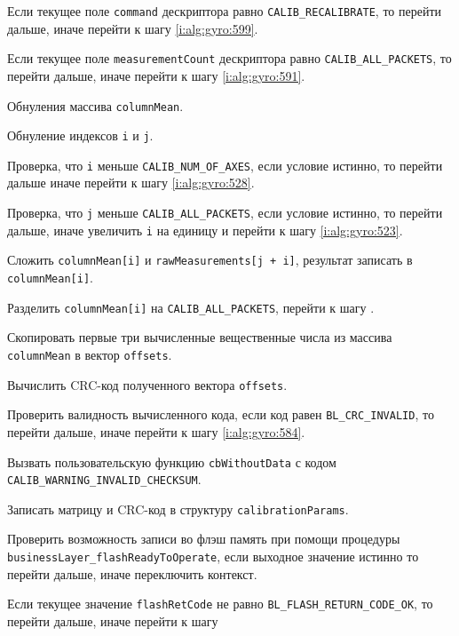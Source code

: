\begin{enumerate_step}
    \item \label{i:alg:gyro:571} Если текущее поле \lstinline|command| дескриптора равно \lstinline|CALIB_RECALIBRATE|, то перейти дальше, иначе перейти к шагу
    \ref{i:alg:gyro:599}.
    \item \label{i:alg:gyro:573} Если текущее поле \lstinline|measurementCount| дескриптора равно \lstinline|CALIB_ALL_PACKETS|, то перейти дальше, иначе перейти к шагу
    \ref{i:alg:gyro:591}.
    \item Обнуления массива \lstinline|columnMean|.
    \item Обнуление индексов \lstinline|i| и \lstinline|j|.
    \item \label{i:alg:gyro:517} Проверка, что \lstinline|i| меньше \lstinline|CALIB_NUM_OF_AXES|, если условие истинно, то перейти дальше иначе перейти к шагу \ref{i:alg:gyro:528}.
    \item Проверка, что \lstinline|j| меньше \lstinline|CALIB_ALL_PACKETS|, если условие истинно, то перейти дальше, иначе увеличить \lstinline|i| на единицу и перейти к шагу \ref{i:alg:gyro:523}.
    \item Сложить \lstinline|columnMean[i]| и \lstinline|rawMeasurements[j + i]|, результат записать в \lstinline|columnMean[i]|.
    \item \label{i:alg:gyro:523} Разделить \lstinline|columnMean[i]| на \lstinline|CALIB_ALL_PACKETS|, перейти к шагу \label{i:alg:gyro:517}.
    \item \label{i:alg:gyro:528} Скопировать первые три вычисленные вещественные числа из массива \lstinline|columnMean| в вектор \lstinline|offsets|.
    \item Вычислить CRC-код полученного вектора \lstinline|offsets|.
    \item Проверить валидность вычисленного кода, если код равен \lstinline|BL_CRC_INVALID|, то перейти дальше, иначе перейти к шагу \ref{i:alg:gyro:584}.
    \item Вызвать пользовательскую функцию \lstinline|cbWithoutData| с кодом \lstinline|CALIB_WARNING_INVALID_CHECKSUM|.
    \item \label{i:alg:gyro:584} Записать матрицу и CRC-код в структуру \lstinline|calibrationParams|.
    \item Проверить возможность записи во флэш память при помощи процедуры \lstinline|businessLayer_flashReadyToOperate|, если выходное значение истинно то перейти дальше, иначе переключить контекст.
    \item Если текущее значение \lstinline|flashRetCode| не равно \lstinline|BL_FLASH_RETURN_CODE_OK|, то перейти дальше, иначе перейти к шагу

\end{enumerate_step}
